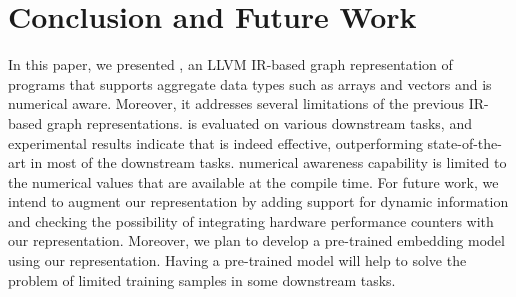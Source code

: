 \section{Conclusion and Future Work}
\label{sec:conclusion}
\vspace{-10pt}
In this paper, we presented \ourtool, an LLVM IR-based graph representation of programs that supports aggregate data types such as arrays and vectors and is numerical aware. Moreover, it addresses several limitations of the previous IR-based graph representations.
\ourtool is evaluated on various downstream tasks, and experimental results indicate that \ourtool is indeed effective, outperforming state-of-the-art in most of the downstream tasks.
\ourtool numerical awareness capability is limited to the numerical values that are available at the compile time.
For future work, we intend to augment our representation by adding support for dynamic information and checking the possibility of integrating hardware performance counters with our representation. Moreover, we plan to develop a pre-trained embedding model using our representation. Having a pre-trained model will help to solve the problem of limited training samples in some downstream tasks.